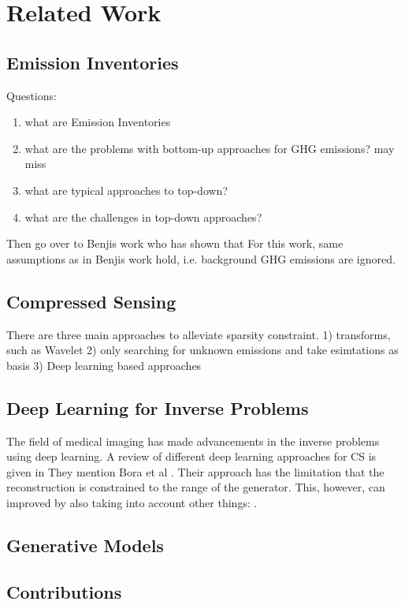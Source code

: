 
\chapter{Related Work}\label{chapter:related_work}

\section{Emission Inventories}
Questions:
\begin{enumerate}
    \item what are Emission Inventories
    \item what are the problems with bottom-up approaches for GHG emissions? 
    \subitem may miss
    \item what are typical approaches to top-down?
    \item what are the challenges in top-down approaches?
\end{enumerate}
Then go over to Benjis work who has shown that 
For this work, same assumptions as in Benjis work hold, i.e. background GHG emissions are ignored.

\section{Compressed Sensing}
There are three main approaches to alleviate sparsity constraint.
1) transforms, such as Wavelet
2) only searching for unknown emissions and take esimtations as basis
3) Deep learning based approaches

\section{Deep Learning for Inverse Problems}
The field of medical imaging has made advancements in the inverse problems using deep learning.
A review of different deep learning approaches for CS is given in \parencite{ReviewCSUsingAI}
They mention Bora et al \parencite{CSUsingAI}.
Their approach has the limitation that the reconstruction is constrained to the range of the generator.
This, however, can improved by also taking into account other things: \parencite{SparseCSUsingAI}.

\section{Generative Models}

\section{Contributions}
